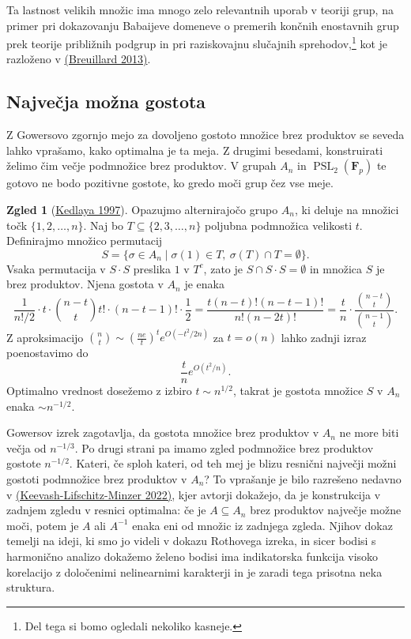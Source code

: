 \documentclass[11pt]{book}
\def\FF{\mathbf{F}}
\DeclareMathOperator\PSL{PSL}
\theoremstyle{definition}
\theoremstyle{zgled}
\newtheorem*{zgled}{Zgled}
\theoremstyle{odprtproblem}
\theoremstyle{domacanaloga}
\theoremstyle{izrek}
\begin{document}
Ta lastnost velikih množic ima mnogo zelo relevantnih uporab v teoriji grup, na primer pri dokazovanju Babaijeve domeneve o premerih končnih enostavnih grup prek teorije približnih podgrup in pri raziskovajnu slučajnih sprehodov,\footnote{Del tega si bomo ogledali nekoliko kasneje.} kot je razloženo v \href{http://library.msri.org/books/Book61/files/15breu.pdf}{(Breuillard 2013)}.

\subsection{Največja možna gostota}

Z Gowersovo zgornjo mejo za dovoljeno gostoto množice brez produktov se seveda lahko vprašamo, kako optimalna je ta meja. Z drugimi besedami, konstruirati želimo čim večje podmnožice brez produktov. V grupah $A_n$ in $\PSL_2(\FF_p)$ te gotovo ne bodo pozitivne gostote, ko gredo moči grup čez vse meje.

\begin{zgled}[\href{https://www.sciencedirect.com/science/article/pii/S0097316597927151}{Kedlaya 1997}]
Opazujmo alternirajočo grupo $A_n$, ki deluje na množici točk $\{ 1, 2, \dots, n \}$. Naj bo $T \subseteq \{2,3,\dots,n \}$ poljubna podmnožica velikosti $t$. Definirajmo množico permutacij
\[
S = \{ \sigma \in A_n \mid \sigma(1) \in T, \ \sigma(T) \cap T = \emptyset \}.
\]
Vsaka permutacija v $S \cdot S$ preslika $1$ v $T^c$, zato je $S \cap S \cdot S = \emptyset$ in množica $S$ je brez produktov. Njena gostota v $A_n$ je enaka
\[
  \frac{1}{n!/2} \cdot t \cdot \binom{n-t}{t} t! \cdot (n-t-1)! \cdot \frac{1}{2}
  = \frac{t (n-t)! (n-t-1)!}{n!(n-2t)!}
  = \frac{t}{n} \cdot \frac{\binom{n-t}{t}}{\binom{n-1}{t}}.
\]
Z aproksimacijo $\binom{n}{t} \sim (\frac{ne}{t})^t e^{O(- t^2/2n)}$ za $t = o(n)$ lahko zadnji izraz poenostavimo do 
\[
    \frac{t}{n} e^{O(t^2/n)}.
\]
Optimalno vrednost dosežemo z izbiro $t \sim n^{1/2}$, takrat je gostota množice $S$ v $A_n$ enaka $\sim n^{-1/2}$. 
\end{zgled}

Gowersov izrek zagotavlja, da gostota množice brez produktov v $A_n$ ne more biti večja od $n^{-1/3}$. Po drugi strani pa imamo zgled podmnožice brez produktov gostote $n^{-1/2}$. Kateri, če sploh kateri, od teh mej je blizu resnični največji možni gostoti podmnožice brez produktov v $A_n$? To vprašanje je bilo razrešeno nedavno v \href{https://arxiv.org/abs/2205.15191}{(Keevash-Lifschitz-Minzer 2022)}, kjer avtorji dokažejo, da je konstrukcija v zadnjem zgledu v resnici optimalna: če je $A \subseteq A_n$ brez produktov največje možne moči, potem je $A$ ali $A^{-1}$ enaka eni od množic iz zadnjega zgleda. Njihov dokaz temelji na ideji, ki smo jo videli v dokazu Rothovega izreka, in sicer bodisi s harmonično analizo dokažemo želeno bodisi ima indikatorska funkcija visoko korelacijo z določenimi nelinearnimi karakterji in je zaradi tega prisotna neka struktura.
\end{document}
